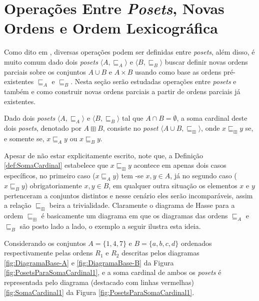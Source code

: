 \section{Operações Entre \textit{Posets}, Novas Ordens e Ordem Lexicográfica}\label{sec:OperacoesPoset}

Como dito em \cite{morgado1962poset}, diversas operações podem ser definidas entre \textit{posets}, além disso, é muito comum dado dois \textit{posets} $\langle A, \sqsubseteq_A \rangle$ e $\langle B, \sqsubseteq_B \rangle$ buscar definir novas ordens parciais sobre os conjuntos $A \cup B$ e $A \times B$ usando como base as ordens pré-existentes $\sqsubseteq_A$ e $\sqsubseteq_B$. Nesta seção serão estudadas operações entre \textit{posets} e também e como construir novas ordens parciais a partir de ordens parciais já existentes.

\begin{definicao}\label{def:SomaCardinal}
	Dado dois \textit{posets} $\langle A, \sqsubseteq_A \rangle$ e $\langle B, \sqsubseteq_B \rangle$ tal que $A \cap B = \emptyset$, a soma cardinal deste dois \textit{posets}, denotado por $A \boxplus B$, consiste no \textit{poset} $\langle A \cup B, \sqsubseteq_\boxplus \rangle$, onde $x \sqsubseteq_\boxplus y$ se, e somente se, $x \sqsubseteq_A y$ ou $x \sqsubseteq_B y$.
\end{definicao}

Apesar de não estar explicitamente escrito, note que, a Definição  \ref{def:SomaCardinal} estabelece que $x \sqsubseteq_\boxplus y$ acontece em apenas dois casos específicos, no primeiro caso ($x \sqsubseteq_A y$) tem -se $x, y \in A$, já no segundo caso ($x \sqsubseteq_B y$) obrigatoriamente $x, y \in B$, em qualquer outra situação os elementos $x$ e $y$ pertenceram a conjuntos distintos e nesse cenário eles serão incomparáveis, assim a relação $\sqsubseteq_\boxplus$ beira a trivialidade. Claramente o diagrama de Hasse para a ordem $\sqsubseteq_\boxplus$ é basicamente um diagrama em que os diagramas das ordens $\sqsubseteq_A$ e $\sqsubseteq_B$ são posto lado a lado, o exemplo a seguir ilustra esta ideia.

\begin{exemplo}
  Considerando os conjuntos $A = \{1, 4, 7\}$ e $B = \{a, b, c, d\}$ ordenados respectivamente pelas ordens $R_1$ e $R_2$ descritas pelos diagramas \ref{fig:DiagramaBase-A} e \ref{fig:DiagramaBase-B} da Figura \ref{fig:PosetsParaSomaCardinal1}, e a soma cardinal de ambos os \textit{posets} é representada pelo diagrama (destacado com linhas vermelhas) \ref{fig:SomaCardinal1} da Figura \ref{fig:PosetsParaSomaCardinal1}.
\end{exemplo}

